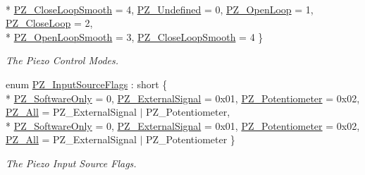 \begin{DoxyCompactItemize}
\\*
\hyperlink{group___common_ggaa4ff718266308759b2633c56c9a813b1ac9c6d9fe59ecf67a3d4c39b21f2afcdf}{P\+Z\+\_\+\+Close\+Loop\+Smooth} = 4, 
\hyperlink{group___common_ggaa4ff718266308759b2633c56c9a813b1a27fa48faa859be560d4a23edd493a730}{P\+Z\+\_\+\+Undefined} = 0, 
\hyperlink{group___common_ggaa4ff718266308759b2633c56c9a813b1a2f2a5e97904da9ce5a640e1f08811fa6}{P\+Z\+\_\+\+Open\+Loop} = 1, 
\hyperlink{group___common_ggaa4ff718266308759b2633c56c9a813b1a8d01c0eb90001b416b7287dda9902f43}{P\+Z\+\_\+\+Close\+Loop} = 2, 
\\*
\hyperlink{group___common_ggaa4ff718266308759b2633c56c9a813b1a0534af989fbfef682192fc10a41f3aa9}{P\+Z\+\_\+\+Open\+Loop\+Smooth} = 3, 
\hyperlink{group___common_ggaa4ff718266308759b2633c56c9a813b1ac9c6d9fe59ecf67a3d4c39b21f2afcdf}{P\+Z\+\_\+\+Close\+Loop\+Smooth} = 4
 \}\begin{DoxyCompactList}\small\item\em The Piezo Control Modes. \end{DoxyCompactList}
\item 
enum \hyperlink{group___common_ga695c409512b2dd48c64f0e8e6ee823c0}{P\+Z\+\_\+\+Input\+Source\+Flags} \+: short \{ \\*
\hyperlink{group___common_gga695c409512b2dd48c64f0e8e6ee823c0ace91f336d4ae004c588a710e332c22ad}{P\+Z\+\_\+\+Software\+Only} = 0, 
\hyperlink{group___common_gga695c409512b2dd48c64f0e8e6ee823c0a83301e0b17e97134d5e8c147ec68a80a}{P\+Z\+\_\+\+External\+Signal} = 0x01, 
\hyperlink{group___common_gga695c409512b2dd48c64f0e8e6ee823c0a86e62401ab600ff73b7792cdf0c6246a}{P\+Z\+\_\+\+Potentiometer} = 0x02, 
\hyperlink{group___common_gga695c409512b2dd48c64f0e8e6ee823c0a0c22aa33c92539c66a45de30c6c6820c}{P\+Z\+\_\+\+All} = P\+Z\+\_\+\+External\+Signal $\vert$ P\+Z\+\_\+\+Potentiometer, 
\\*
\hyperlink{group___common_gga695c409512b2dd48c64f0e8e6ee823c0ace91f336d4ae004c588a710e332c22ad}{P\+Z\+\_\+\+Software\+Only} = 0, 
\hyperlink{group___common_gga695c409512b2dd48c64f0e8e6ee823c0a83301e0b17e97134d5e8c147ec68a80a}{P\+Z\+\_\+\+External\+Signal} = 0x01, 
\hyperlink{group___common_gga695c409512b2dd48c64f0e8e6ee823c0a86e62401ab600ff73b7792cdf0c6246a}{P\+Z\+\_\+\+Potentiometer} = 0x02, 
\hyperlink{group___common_gga695c409512b2dd48c64f0e8e6ee823c0a0c22aa33c92539c66a45de30c6c6820c}{P\+Z\+\_\+\+All} = P\+Z\+\_\+\+External\+Signal $\vert$ P\+Z\+\_\+\+Potentiometer
 \}\begin{DoxyCompactList}\small\item\em The Piezo Input Source Flags. \end{DoxyCompactList}

\end{DoxyCompactItemize}
